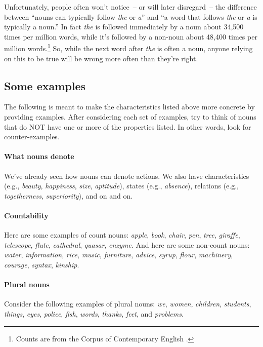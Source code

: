 Unfortunately, people often won't notice~-- or will later disregard~-- the difference between ``nouns can typically follow \textit{the} or \textit{a}'' and ``a word that follows \textit{the} or \textit{a} is typically a noun.'' In fact \textit{the} is followed immediately by a noun about 34,500 times per million words, while it's followed by a non-noun about 48,400 times per million words.\footnote{Counts are from the Corpus of Contemporary English \citep{COCA}.} So, while the next word after \textit{the} is often a noun, anyone relying on this to be true will be wrong more often than they're right.

\subsection{Some examples}\label{sec:examples}
The following is meant to make the characteristics listed above more concrete by providing examples. After considering each set of examples, try to think of nouns that do NOT have one or more of the properties listed. In other words, look for counter-examples.


\paragraph*{What nouns denote}
We've already seen how nouns can denote actions. We also have characteristics (e.g., \textit{beauty}, \textit{happiness}, \textit{size}, \textit{aptitude}), states (e.g., \textit{absence}), relations (e.g., \textit{togetherness}, \textit{superiority}), and on and on.

\paragraph*{Countability}

Here are some examples of count nouns: \textit{apple}, \textit{book}, \textit{chair}, \textit{pen}, \textit{tree}, \textit{giraffe}, \textit{telescope}, \textit{flute}, \textit{cathedral}, \textit{quasar}, \textit{enzyme}. And here are some non-count nouns: \textit{water}, \textit{information}, \textit{rice}, \textit{music}, \textit{furniture}, \textit{advice}, \textit{syrup}, \textit{flour}, \textit{machinery}, \textit{courage}, \textit{syntax}, \textit{kinship}.

\paragraph*{Plural nouns}
Consider the following examples of plural nouns: \textit{we}, \textit{women}, \textit{children}, \textit{students}, \textit{things}, \textit{eyes}, \textit{police}, \textit{fish}, \textit{words}, \textit{thanks}, \textit{feet}, and \textit{problems}.

